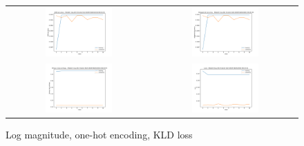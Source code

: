 \begin{appendices}
        \begin{figure}[H]
            \centering
            \begin{tabular}{cc}
                \includegraphics[width=0.48\textwidth]{figures/training_plots/ModelC-(log_2D)-OneHot-KLD-ADAM_06-04-2019_08-42-01_AON-accuracy.pdf} & \includegraphics[width=0.48\textwidth]{figures/training_plots/ModelC-(log_2D)-OneHot-KLD-ADAM_06-04-2019_08-42-01_categorical-accuracy.pdf} \\
                \includegraphics[width=0.48\textwidth]{figures/training_plots/ModelC-(log_2D)-OneHot-KLD-ADAM_06-04-2019_08-42-01_binary-cross-entropy.pdf} & \includegraphics[width=0.48\textwidth]{figures/training_plots/ModelC-(log_2D)-OneHot-KLD-ADAM_06-04-2019_08-42-01_loss.pdf}
            \end{tabular}
            \caption*{Log magnitude, one-hot encoding, KLD loss}
        \end{figure}
        

\end{appendices}

